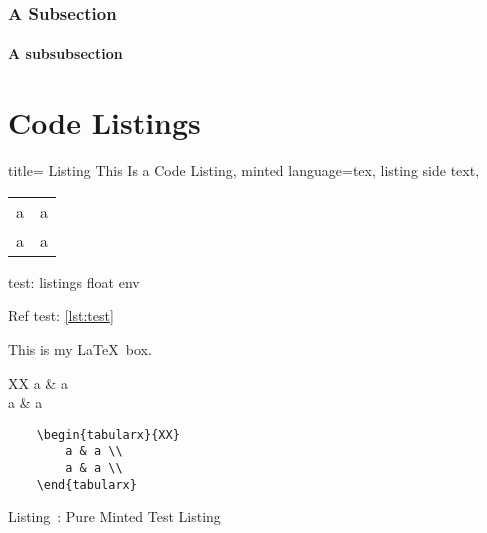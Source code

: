 \documentclass[a4paper,11pt,oneside,showtrims]{alpenthesis}
\begin{document}
\subsection{A Subsection}
\lipsum[1]

\subsubsection{A subsubsection}
\lipsum[2]

\chapter{Code Listings}
\begin{listing}
    \tikzexternaldisable
    \begin{tcblisting}{%
            title={\label{lst:test} Listing \theATlisting This Is a Code Listing},
            minted language=tex,
            listing side text,
            }
        \begin{tabular}{ll}
            a & a \\
            a & a \\
        \end{tabular}
    \end{tcblisting}
    \tikzexternalenable
    \caption{test: listings float env}
\end{listing}

Ref test: \ref{lst:test}

\tikzexternaldisable
\begin{mybox}[
    title={test tcolorbox},
    minted language=tex,
    ]
    This is my
    \LaTeX\ box.
    \begin{tabularx}{XX}
        a & a \\
        a & a \\
    \end{tabularx}
\end{mybox}
\tikzexternalenable

\begin{verbatim}
    \begin{tabularx}{XX}
        a & a \\
        a & a \\
    \end{tabularx}
\end{verbatim}
\label{lst:minted}Listing~\theATlisting: Pure Minted Test Listing
\end{document}
